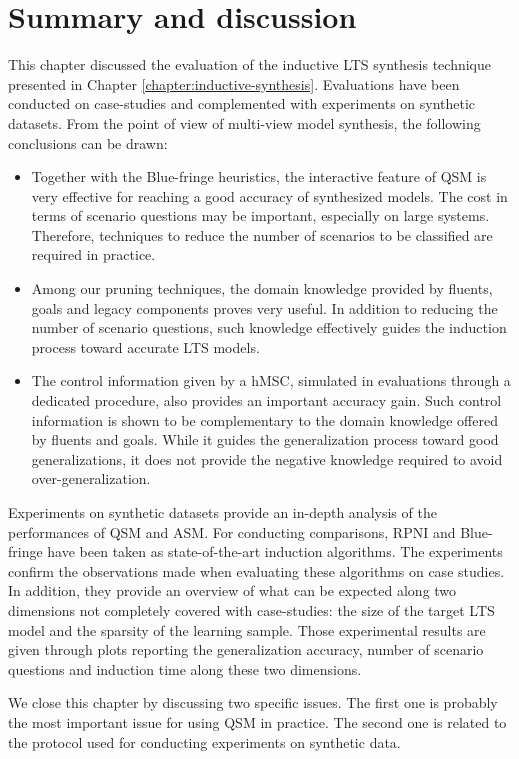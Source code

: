 \section{Summary and discussion\label{section:evaluation-summary}}

This chapter discussed the evaluation of the inductive LTS synthesis technique presented in Chapter \ref{chapter:inductive-synthesis}. Evaluations have been conducted on case-studies and complemented with experiments on synthetic datasets. From the point of view of multi-view model synthesis, the following conclusions can be drawn:
\begin{itemize}
\item Together with the Blue-fringe heuristics, the interactive feature of QSM is very effective for reaching a good accuracy of synthesized models. The cost in terms of scenario questions may be important, especially on large systems. Therefore, techniques to reduce the number of scenarios to be classified are required in practice.
\item Among our pruning techniques, the domain knowledge provided by fluents, goals and legacy components proves very useful. In addition to reducing the number of scenario questions, such knowledge effectively guides the induction process toward accurate LTS models. 
\item The control information given by a hMSC, simulated in evaluations through a dedicated procedure, also provides an important accuracy gain. Such control information is shown to be complementary to the domain knowledge offered by fluents and goals. While it guides the generalization process toward good generalizations, it does not provide the negative knowledge required to avoid over-generalization.
\end{itemize}

Experiments on synthetic datasets provide an in-depth analysis of the performances of QSM and ASM. For conducting comparisons, RPNI and Blue-fringe have been taken as state-of-the-art induction algorithms. The experiments confirm the observations made when evaluating these algorithms on case studies. In addition, they provide an overview of what can be expected along two dimensions not completely covered with case-studies: the size of the target LTS model and the sparsity of the learning sample. Those experimental results are given through plots reporting the generalization accuracy, number of scenario questions and induction time along these two dimensions.

We close this chapter by discussing two specific issues. The first one is probably the most important issue for using QSM in practice. The second one is related to the protocol used for conducting experiments on synthetic data. 

